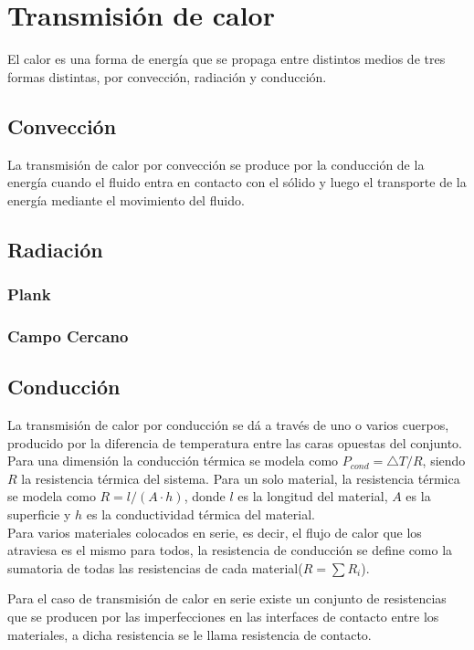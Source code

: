 \section{Transmisión de calor}
El calor es una forma de energía que se propaga entre distintos medios de tres formas distintas, por convección, radiación y conducción.
\subsection{Convección}
La transmisión de calor por convección se produce por la conducción de la energía cuando el fluido entra en contacto con el sólido y luego el transporte de la energía mediante el movimiento del fluido.
\subsection{Radiación}

\subsubsection{Plank}
\subsubsection{Campo Cercano}
\subsection{Conducción}
La transmisión de calor por conducción se dá a través de uno o varios cuerpos, producido por la diferencia de temperatura entre las caras opuestas del conjunto. Para una dimensión la conducción térmica se modela como $P_{cond}={\bigtriangleup T}/{R} $, siendo $R$ la resistencia térmica del sistema.
Para un solo material, la resistencia térmica se modela como $R = l/{\left(A\cdot h\right)}$, donde $l$ es la longitud del material, $A$ es la superficie y $h$ es la conductividad térmica del material.\\

Para varios materiales colocados en serie, es decir, el flujo de calor que los atraviesa es el mismo para todos, la resistencia de conducción se define como la sumatoria de todas las resistencias de cada material($R=\sum R_i$).

Para el caso de transmisión de calor en serie existe un conjunto de resistencias que se producen por las imperfecciones en las interfaces de contacto entre los materiales, a dicha resistencia se le llama resistencia de contacto.


